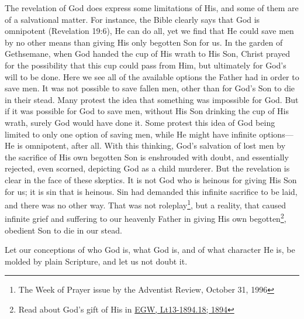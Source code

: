 The revelation of God does express some limitations of His, and some of them are of a salvational matter. For instance, the Bible clearly says that God is omnipotent (Revelation 19:6), He can do all, yet we find that He could save men by no other means than giving His only begotten Son for us. In the garden of Gethsemane, when God handed the cup of His wrath to His Son, Christ prayed for the possibility that this cup could pass from Him, but ultimately for God's will to be done. Here we see all of the available options the Father had in order to save men. It was not possible to save fallen men, other than for God’s Son to die in their stead. Many protest the idea that something was impossible for God. But if it was possible for God to save men, without His Son drinking the cup of His wrath, surely God would have done it. Some protest this idea of God being limited to only one option of saving men, while He might have infinite options—He is omnipotent, after all. With this thinking, God’s salvation of lost men by the sacrifice of His own begotten Son is enshrouded with doubt, and essentially rejected, even scorned, depicting God as a child murderer. But the revelation is clear in the face of these skeptics. It is not God who is heinous for giving His Son for us; it is sin that is heinous. Sin had demanded this infinite sacrifice to be laid, and there was no other way. That was not roleplay\footnote{The Week of Prayer issue by the Adventist Review, October 31, 1996}, but a reality, that caused infinite grief and suffering to our heavenly Father in giving His own begotten\footnote{Read about God’s gift of His  in \href{https://egwwritings.org/?ref=en_Lt13-1894.18&para=5486.24}{{EGW, Lt13-1894.18; 1894}}}, obedient Son to die in our stead.

Let our conceptions of who God is, what God is, and of what character He is, be molded by plain Scripture, and let us not doubt it.

